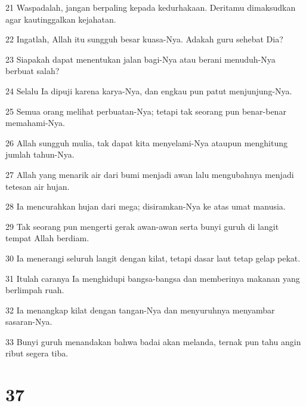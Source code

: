 \par 21 Waspadalah, jangan berpaling kepada kedurhakaan. Deritamu dimaksudkan agar kautinggalkan kejahatan.
\par 22 Ingatlah, Allah itu sungguh besar kuasa-Nya. Adakah guru sehebat Dia?
\par 23 Siapakah dapat menentukan jalan bagi-Nya atau berani menuduh-Nya berbuat salah?
\par 24 Selalu Ia dipuji karena karya-Nya, dan engkau pun patut menjunjung-Nya.
\par 25 Semua orang melihat perbuatan-Nya; tetapi tak seorang pun benar-benar memahami-Nya.
\par 26 Allah sungguh mulia, tak dapat kita menyelami-Nya ataupun menghitung jumlah tahun-Nya.
\par 27 Allah yang menarik air dari bumi menjadi awan lalu mengubahnya menjadi tetesan air hujan.
\par 28 Ia mencurahkan hujan dari mega; disiramkan-Nya ke atas umat manusia.
\par 29 Tak seorang pun mengerti gerak awan-awan serta bunyi guruh di langit tempat Allah berdiam.
\par 30 Ia menerangi seluruh langit dengan kilat, tetapi dasar laut tetap gelap pekat.
\par 31 Itulah caranya Ia menghidupi bangsa-bangsa dan memberinya makanan yang berlimpah ruah.
\par 32 Ia menangkap kilat dengan tangan-Nya dan menyuruhnya menyambar sasaran-Nya.
\par 33 Bunyi guruh menandakan bahwa badai akan melanda, ternak pun tahu angin ribut segera tiba.

\chapter{37}

